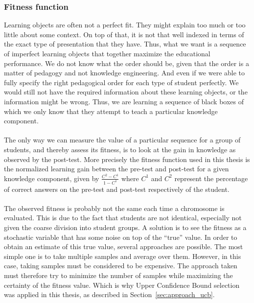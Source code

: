 \subsubsection{Fitness function}
Learning objects are often not a perfect fit. They might explain too much or too
little about some context. On top of that, it is not that well indexed in terms of the
exact type of presentation that they have. Thus, what we want is a
sequence of imperfect learning objects that together maximize the
educational performance. We do not know what the order should be, given
that the order is a matter of pedagogy and not knowledge engineering.
And even if we were able to fully specify the right pedagogical order
for each type of student perfectly. We would still not have the
required information about these learning objects, or the information
might be wrong. Thus, we are learning a sequence of black
boxes of which we only know that they attempt to teach a particular
knowledge component.\\\\
\noindent
The only way we can measure the value of a particular sequence for a
group of students, and thereby assess its fitness, is to look at the
gain in knowledge as observed by the post-test. More precisely the fitness
function used in this thesis is the normalized learning gain between the
pre-test and post-test for a given knowledge component, given by $\frac{C^2 -
C^1}{1-C^1}$ where $C^1$ and $C^2$ represent the percentage of correct answers
on the pre-test and post-test respectively of the student.\\\\
\noindent
The observed fitness is probably not the same each time a chromosome
is evaluated. This is due to the fact that students are not identical,
especially not given the coarse division into student groups. A solution
is to see the fitness as a stochastic variable that has some noise on
top of the ``true'' value. In order to obtain an estimate of this true
value, several approaches are possible. The most simple one is to take
multiple samples and average over them. However, in this case, taking
samples must be considered to be expensive. The approach taken must
therefore try to minimize the number of samples while maximizing the
certainty of the fitness value. Which is why Upper Confidence Bound selection
was applied in this thesis, as described in Section~\ref{sec:approach_ucb}.

